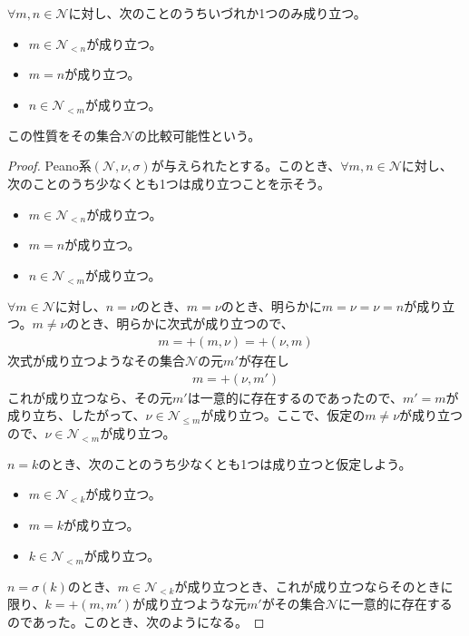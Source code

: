 \documentclass[dvipdfmx]{jsarticle}
\begin{document}
\begin{thm}\label{1.2.4.19}
$\forall m,n \in \mathcal{N}$に対し、次のことのうちいづれか1つのみ成り立つ。
\begin{itemize}
\item
  $m \in \mathcal{N}_{< n}$が成り立つ。
\item
  $m = n$が成り立つ。
\item
  $n \in \mathcal{N}_{< m}$が成り立つ。
\end{itemize}
\end{thm}
この性質をその集合$\mathcal{N}$の比較可能性という。
\begin{proof}
Peano系$\left( \mathcal{N,}\nu,\sigma \right)$が与えられたとする。このとき、$\forall m,n \in \mathcal{N}$に対し、次のことのうち少なくとも1つは成り立つことを示そう。
\begin{itemize}
\item
  $m \in \mathcal{N}_{< n}$が成り立つ。
\item
  $m = n$が成り立つ。
\item
  $n \in \mathcal{N}_{< m}$が成り立つ。
\end{itemize}\par
$\forall m \in \mathcal{N}$に対し、$n = \nu$のとき、$m = \nu$のとき、明らかに$m = \nu = \nu = n$が成り立つ。$m \neq \nu$のとき、明らかに次式が成り立つので、
\begin{align*}
m = + (m,\nu) = + (\nu,m)
\end{align*}
次式が成り立つようなその集合$\mathcal{N}$の元$m'$が存在し
\begin{align*}
m = + \left( \nu,m' \right)
\end{align*}
これが成り立つなら、その元$m'$は一意的に存在するのであったので、$m' = m$が成り立ち、したがって、$\nu \in \mathcal{N}_{\leq m}$が成り立つ。ここで、仮定の$m \neq \nu$が成り立つので、$\nu \in \mathcal{N}_{< m}$が成り立つ。\par
$n = k$のとき、次のことのうち少なくとも1つは成り立つと仮定しよう。
\begin{itemize}
\item
  $m \in \mathcal{N}_{< k}$が成り立つ。
\item
  $m = k$が成り立つ。
\item
  $k \in \mathcal{N}_{< m}$が成り立つ。
\end{itemize}
$n = \sigma(k)$のとき、$m \in \mathcal{N}_{< k}$が成り立つとき、これが成り立つならそのときに限り、$k = + \left( m,m' \right)$が成り立つような元$m'$がその集合$\mathcal{N}$に一意的に存在するのであった。このとき、次のようになる。

\end{proof}
\end{document}
